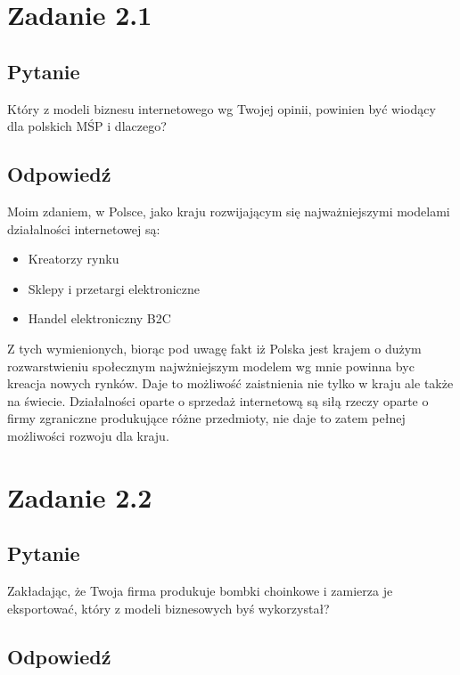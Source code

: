 \documentclass[paper=a4, fontsize=11pt]{scrartcl} %
\numberwithin{equation}{section} %
\numberwithin{figure}{section} %
\numberwithin{table}{section} %
\begin{document}
\section{Zadanie 2.1}

\subsection {Pytanie}

Który z modeli biznesu internetowego wg Twojej opinii, powinien być wiodący dla polskich MŚP i dlaczego?

\subsection  {Odpowiedź}

Moim zdaniem, w Polsce, jako kraju rozwijającym się najważniejszymi modelami działalności internetowej są:

\begin{itemize}
  \item Kreatorzy rynku
  \item Sklepy i przetargi elektroniczne
  \item Handel elektroniczny B2C
\end{itemize}

Z tych wymienionych, biorąc pod uwagę fakt iż Polska jest krajem o dużym rozwarstwieniu społecznym najwżniejszym modelem wg mnie
powinna byc kreacja nowych rynków. Daje to możliwość zaistnienia nie tylko w kraju ale także na świecie. Działalności oparte o sprzedaż internetową
są siłą rzeczy oparte o firmy zgraniczne produkujące różne przedmioty, nie daje to zatem pełnej możliwości rozwoju dla kraju.

\section{Zadanie 2.2}

\subsection {Pytanie}

Zakładając, że Twoja firma produkuje bombki choinkowe i zamierza je eksportować, który z modeli biznesowych byś wykorzystał?

\subsection  {Odpowiedź}
\end{document}
